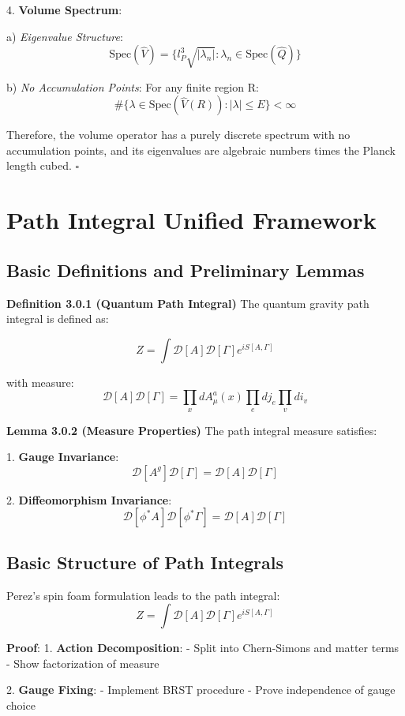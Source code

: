 \documentclass[12pt,a4paper]{article}
\begin{document}
4. \textbf{Volume Spectrum}:
   
   a) \textit{Eigenvalue Structure}:
      \[
      \text{Spec}(\hat{V}) = \{l_P^3\sqrt{|\lambda_n|}: \lambda_n \in \text{Spec}(\hat{Q})\}
      \]
   
   b) \textit{No Accumulation Points}:
      For any finite region R:
      \[
      \#\{\lambda \in \text{Spec}(\hat{V}(R)): |\lambda| \leq E\} < \infty
      \]

Therefore, the volume operator has a purely discrete spectrum with no accumulation points, and its eigenvalues are algebraic numbers times the Planck length cubed. $\square$

\section{Path Integral Unified Framework}
\subsection{Basic Definitions and Preliminary Lemmas}

\textbf{Definition 3.0.1 (Quantum Path Integral)}
The quantum gravity path integral is defined as:


\[
Z = \int \mathcal{D}[A]\mathcal{D}[\Gamma] e^{iS[A,\Gamma]}
\]

with measure:
\[
\mathcal{D}[A]\mathcal{D}[\Gamma] = \prod_x dA_\mu^a(x) \prod_e dj_e \prod_v di_v
\]

\textbf{Lemma 3.0.2 (Measure Properties)}
The path integral measure satisfies:

1. \textbf{Gauge Invariance}:
   \[
   \mathcal{D}[A^g]\mathcal{D}[\Gamma] = \mathcal{D}[A]\mathcal{D}[\Gamma]
   \]

2. \textbf{Diffeomorphism Invariance}:
   \[
   \mathcal{D}[\phi^*A]\mathcal{D}[\phi^*\Gamma] = \mathcal{D}[A]\mathcal{D}[\Gamma]
   \]

\subsection{Basic Structure of Path Integrals}
Perez's spin foam formulation\cite{perez2003spin} leads to the path integral:
\[
Z = \int \mathcal{D}[A]\mathcal{D}[\Gamma] e^{iS[A,\Gamma]}
\]

\textbf{Proof}:
1. \textbf{Action Decomposition}:
   - Split into Chern-Simons and matter terms
   - Show factorization of measure

2. \textbf{Gauge Fixing}:
   - Implement BRST procedure
   - Prove independence of gauge choice
\end{document}
